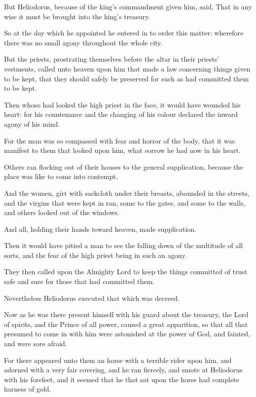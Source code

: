 {\par }{\PP {}But Heliodorus, because of the king’s commandment given him, said, That in any wise it must be brought into the king’s treasury.
\par }{\PP {}So at the day which he appointed he entered in to order this matter: wherefore there was no small agony throughout the whole city.
\par }{\PP {}But the priests, prostrating themselves before the altar in their priests’ vestments, called unto heaven upon him that made a law concerning things given to be kept, that they should safely be preserved for such as had committed them to be kept.
\par }{\PP {}Then whoso had looked the high priest in the face, it would have wounded his heart: for his countenance and the changing of his colour declared the inward agony of his mind.
\par }{\PP {}For the man was so compassed with fear and horror of the body, that it was manifest to them that looked upon him, what sorrow he had now in his heart.
\par }{\PP {}Others ran flocking out of their houses to the general supplication, because the place was like to come into contempt.
\par }{\PP {}And the women, girt with sackcloth under their breasts, abounded in the streets, and the virgins that were kept in ran, some to the gates, and some to the walls, and others looked out of the windows.
\par }{\PP {}And all, holding their hands toward heaven, made supplication.
\par }{\PP {}Then it would have pitied a man to see the falling down of the multitude of all sorts, and the fear of the high priest being in such an agony.
\par }{\PP {}They then called upon the Almighty Lord to keep the things committed of trust safe and sure for those that had committed them.
\par }{\PP {}Nevertheless Heliodorus executed that which was decreed.
\par }{\PP {}Now as he was there present himself with his guard about the treasury, the Lord of spirits, and the Prince of all power, caused a great apparition, so that all that presumed to come in with him were astonished at the power of God, and fainted, and were sore afraid.
\par }{\PP {}For there appeared unto them an horse with a terrible rider upon him, and adorned with a very fair covering, and he ran fiercely, and smote at Heliodorus with his forefeet, and it seemed that he that sat upon the horse had complete harness of gold.
}
